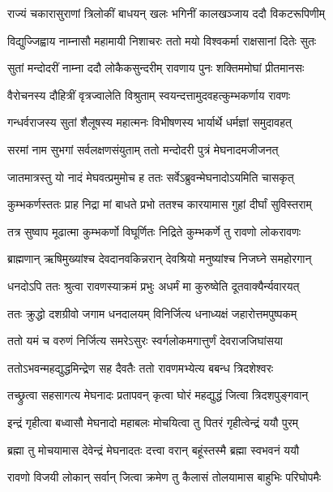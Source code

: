 \twolineshloka
{राज्यं चकारासुराणां त्रिलोकीं बाधयन् खलः}
{भगिनीं कालखञ्जाय ददौ विकटरूपिणीम्} %

\twolineshloka
{विद्युज्जिह्वाय नाम्नासौ महामायी निशाचरः}
{ततो मयो विश्वकर्मा राक्षसानां दितेः सुतः} %

\twolineshloka
{सुतां मन्दोदरीं नाम्ना ददौ लोकैकसुन्दरीम्}
{रावणाय पुनः शक्तिममोघां प्रीतमानसः} %

\twolineshloka
{वैरोचनस्य दौहित्रीं वृत्रज्वालेति विश्रुताम्}
{स्वयन्दत्तामुदवहत्कुम्भकर्णाय रावणः} %

\twolineshloka
{गन्धर्वराजस्य सुतां शैलूषस्य महात्मनः}
{विभीषणस्य भार्यार्थे धर्मज्ञां समुदावहत्} %

\twolineshloka
{सरमां नाम सुभगां सर्वलक्षणसंयुताम्}
{ततो मन्दोदरी पुत्रं मेघनादमजीजनत्} %

\twolineshloka
{जातमात्रस्तु यो नादं मेघवत्प्रमुमोच ह}
{ततः सर्वेऽब्रुवन्मेघनादोऽयमिति चासकृत्} %

\twolineshloka
{कुम्भकर्णस्ततः प्राह निद्रा मां बाधते प्रभो}
{ततश्च कारयामास गुहां दीर्घां सुविस्तराम्} %

\twolineshloka
{तत्र सुष्वाप मूढात्मा कुम्भकर्णो विघूर्णितः}
{निद्रिते कुम्भकर्णे तु रावणो लोकरावणः} %

\twolineshloka
{ब्राह्मणान् ऋषिमुख्यांश्च देवदानवकिन्नरान्}
{देवश्रियो मनुष्यांश्च निजघ्ने समहोरगान्} %

\twolineshloka
{धनदोऽपि ततः श्रुत्वा रावणस्याक्रमं प्रभुः}
{अधर्मं मा कुरुष्वेति दूतवाक्यैर्न्यवारयत्} %

\twolineshloka
{ततः क्रुद्धो दशग्रीवो जगाम धनदालयम्}
{विनिर्जित्य धनाध्यक्षं जहारोत्तमपुष्पकम्} %

\twolineshloka
{ततो यमं च वरुणं निर्जित्य समरेऽसुरः}
{स्वर्गलोकमगात्तुर्णं देवराजजिघांसया} %

\twolineshloka
{ततोऽभवन्महद्युद्धमिन्द्रेण सह दैवतैः}
{ततो रावणमभ्येत्य बबन्ध त्रिदशेश्वरः} %

\twolineshloka
{तच्छ्रुत्वा सहसागत्य मेघनादः प्रतापवन्}
{कृत्वा घोरं महद्युद्धं जित्वा त्रिदशपुङ्गवान्} %

\twolineshloka
{इन्द्रं गृहीत्वा बध्वासौ मेघनादो महाबलः}
{मोचयित्वा तु पितरं गृहीत्वेन्द्रं ययौ पुरम्} %

\twolineshloka
{ब्रह्मा तु मोचयामास देवेन्द्रं मेघनादतः}
{दत्त्वा वरान् बहूंस्तस्मै ब्रह्मा स्वभवनं ययौ} %

\twolineshloka
{रावणो विजयी लोकान् सर्वान् जित्वा क्रमेण तु}
{कैलासं तोलयामास बाहुभिः परिघोपमैः} %

